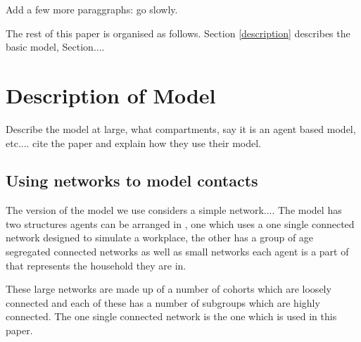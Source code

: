 \documentclass{article}
\begin{document}
Add a few more paraggraphs: go slowly.


The rest of this paper is organised as follows. Section \ref{description} describes the basic model, Section....



\section{Description of Model \label{description}}


Describe the model at large, what compartments, say it is an agent based model, etc.... cite the paper and explain how they use their model.




\subsection{Using networks to model contacts}

The version of the model we use considers a simple network.... The model has two structures agents can be arranged in , one which uses a one single connected network designed to simulate a workplace, the other has a group of age segregated connected networks as well as small networks each agent is a part of that represents the household they are in. 

These large networks are made up of a number of cohorts which are loosely connected and each of these has a number of subgroups which are highly connected. The one single connected network is the one which is used in this paper.
\end{document}
